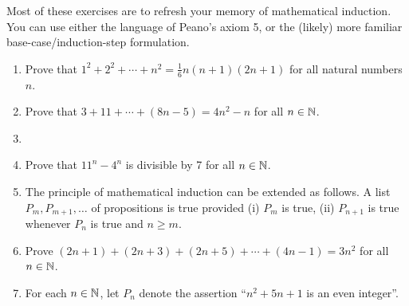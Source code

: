 \begin{exercisessec}{}{}
Most of these exercises are to refresh your memory of mathematical induction. You can use either the language of Peano's axiom 5, or the (likely) more familiar base-case/induction-step formulation.

\begin{enumerate}%
  \item%
  Prove that $1^2+2^2+\cdots+n^2=\frac 16n(n+1)(2n+1)$ for all natural numbers $n$.
  
  \item%
  Prove that $3+11+\cdots+(8n-5)=4n^2-n$ for all $n\in\mathbb{N}$.

  \item%
  
  \item%
  Prove that $11^n-4^n$ is divisible by 7 for all $n\in\mathbb{N}$.
  
  \item%
  The principle of mathematical induction can be extended as follows. A list $P_m,P_{m+1},\ldots$ of propositions is true provided (i) $P_m$ is true, (ii) $P_{n+1}$ is true whenever $P_n$ is true and $n\ge m$.
  
  \item%
  Prove $(2n+1)+(2n+3)+(2n+5)+\cdots+(4n-1)=3n^2$ for all $n\in\mathbb{N}$.
  
  \item%
  For each $n\in\mathbb{N}$, let $P_n$ denote the assertion ``$n^2+5n+1$ is an even integer''.
  

\end{enumerate}
\end{exercisessec}
